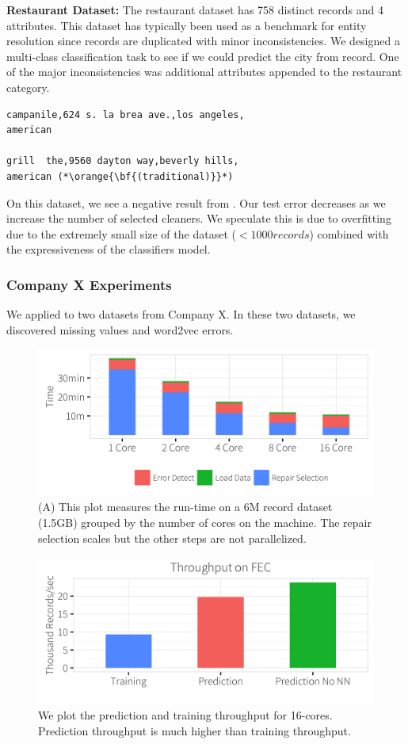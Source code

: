 \vspace{0.5em}\noindent\textbf{Restaurant Dataset: } The restaurant dataset has 758 distinct records and 4 attributes. This dataset has typically been used as a benchmark for entity resolution since records are duplicated with minor inconsistencies.
We designed a multi-class classification task to see if we could predict the city from record.
One of the major inconsistencies was additional attributes appended to the restaurant category.

\begin{lstlisting}
campanile,624 s. la brea ave.,los angeles,
american

grill  the,9560 dayton way,beverly hills,
american (*\orange{\bf{(traditional)}}*)
\end{lstlisting}

On this dataset, we see a negative result from \sys. Our test error decreases as we increase the number of selected cleaners. We speculate this is due to overfitting due to the extremely small size of the dataset  ($<1000 records$) combined with the expressiveness of the classifiers model.

\subsubsection{Company X Experiments}
We applied \sys to two datasets from Company X. In these two datasets, we discovered missing values and word2vec errors. 



\begin{figure}[t]
\centering
\includegraphics[width=0.8\columnwidth]{exp/runtime.png}
\caption{(A) This plot measures the run-time on a 6M record dataset (1.5GB) grouped by the number of cores on the machine. The repair selection scales but the other steps are not parallelized.\label{exp:runtime}}
\end{figure}

\begin{figure}[t]
\centering
\includegraphics[width=0.8\columnwidth]{exp/runtime2.png}
\caption{We plot the prediction and training throughput for 16-cores. Prediction throughput is much higher than training throughput.\label{exp:tp}}
\end{figure}


